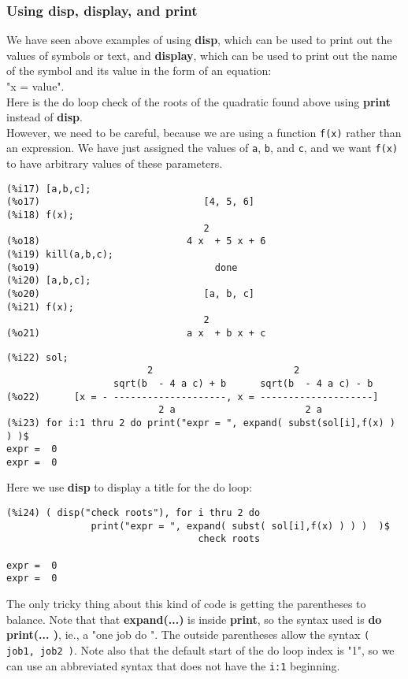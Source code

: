 \documentclass[12pt]{article}
\begin{document}
\subsubsection{Using disp, display, and print}
We have seen above examples of using \textbf{disp}, which can be used to print out
  the values of symbols or text, and \textbf{display}, which can be used to print
  out the name of the symbol and its value in the form of an equation:\\ "x = value".\\
Here is the do loop check of the roots of the quadratic found above using \textbf{print}
  instead of \textbf{disp}.\\
However, we need to be careful, because we are using a function \verb|f(x)| rather
  than an expression.
We have just assigned the values of \verb|a|, \verb|b|, and \verb|c|, and we
  want \verb|f(x)| to have arbitrary values of these parameters.
\small
\begin{verbatim}
(%i17) [a,b,c];
(%o17)                             [4, 5, 6]
(%i18) f(x);
                                   2
(%o18)                          4 x  + 5 x + 6
(%i19) kill(a,b,c);
(%o19)                               done
(%i20) [a,b,c];
(%o20)                             [a, b, c]
(%i21) f(x);
                                   2
(%o21)                          a x  + b x + c
\end{verbatim}
\newpage
\begin{verbatim}
(%i22) sol;
                         2                         2
                   sqrt(b  - 4 a c) + b      sqrt(b  - 4 a c) - b
(%o22)      [x = - --------------------, x = --------------------]
                           2 a                       2 a
(%i23) for i:1 thru 2 do print("expr = ", expand( subst(sol[i],f(x) ) ) )$
expr =  0 
expr =  0 
\end{verbatim}
\normalsize
Here we use \textbf{disp} to display a title for the do loop:
\small
\begin{verbatim}
(%i24) ( disp("check roots"), for i thru 2 do
               print("expr = ", expand( subst( sol[i],f(x) ) ) )  )$
                                  check roots

expr =  0 
expr =  0 
\end{verbatim}
\normalsize
The only tricky thing about this kind of code is getting the parentheses to balance.
Note that that \textbf{expand(...)} is inside \textbf{print}, so the syntax
  used is \textbf{do print(... )}, ie., a "one job do ".
The outside parentheses allow the syntax \verb|( job1, job2 )|.
Note also that the default start of the do loop index is "1", so we can use an abbreviated
 syntax that does not have the \verb|i:1| beginning.
\end{document}
